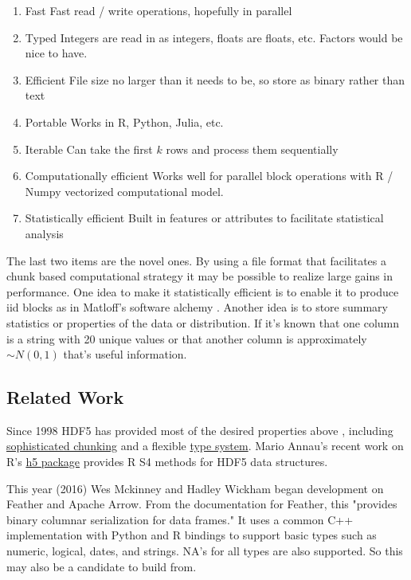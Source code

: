 \documentclass[12pt]{article}
\begin{document}
\begin{enumerate}
    \item{Fast} Fast read / write operations, hopefully in parallel
    \item{Typed} Integers are read in as integers, floats are floats, etc.
        Factors would be nice to have.
    \item{Efficient} File size no larger than it needs to be, so store as
        binary rather than text
    \item{Portable} Works in R, Python, Julia, etc.
    \item{Iterable} Can take the first $k$ rows and process them
        sequentially
    \item{Computationally efficient} Works well for parallel block
        operations with R / Numpy vectorized computational model.
    \item{Statistically efficient} Built in features or attributes to
        facilitate statistical analysis
\end{enumerate}

The last two items are the novel ones. By using a file format
that facilitates a chunk based computational strategy it may be possible to
realize large gains in performance. One idea to make it statistically
efficient is to enable it to produce iid blocks as in Matloff's software
alchemy \cite{matloff2014software}. Another idea is to store summary
statistics or properties of the data or distribution. If it's known that
one column is a string with 20 unique values or that another column is
approximately $\sim N(0, 1)$ that's useful information. 

\subsection{Related Work}

Since 1998 HDF5 has provided most of the desired properties above
\cite{hdf5}, including
\href{https://support.hdfgroup.org/HDF5/doc/Advanced/Chunking/}{sophisticated
chunking} and a flexible
\href{https://support.hdfgroup.org/HDF5/doc1.6/UG/11_Datatypes.html}{type system}.
Mario Annau's recent work on R's \href{https://github.com/mannau/h5}{h5
package} provides R S4 methods for HDF5 data structures.

This year (2016) Wes Mckinney and Hadley Wickham began development on Feather and
Apache Arrow. From the documentation for Feather, this "provides binary columnar
serialization for data frames." It uses a common C++ implementation with
Python and R bindings to support basic types such as numeric, logical,
dates, and strings. NA's for all types are also supported. So this may also
be a candidate to build from.
\end{document}
